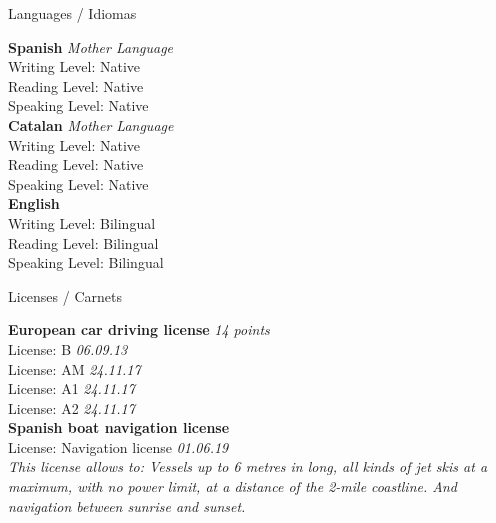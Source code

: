 \documentclass{resume} %
\begin{document}
\begin{rSection}{Languages / Idiomas}

{\bf Spanish} \hfill {\em Mother Language}\\ 
Writing Level: Native \\
Reading Level: Native \\
Speaking Level: Native \\

{\bf Catalan} \hfill {\em Mother Language}\\ 
Writing Level: Native \\
Reading Level: Native \\
Speaking Level: Native \\

{\bf English} \\ 
Writing Level: Bilingual \\
Reading Level: Bilingual \\
Speaking Level: Bilingual \\

\end{rSection}


\begin{rSection}{Licenses / Carnets}

{\bf European car driving license} \hfill {\em 14 points}\\ 
License: B \hfill {\em 06.09.13} \\
License: AM \hfill {\em 24.11.17} \\
License: A1 \hfill {\em 24.11.17} \\
License: A2 \hfill {\em 24.11.17} \\

{\bf Spanish boat navigation license} \\ 
License: Navigation license \hfill {\em 01.06.19} \\
{\it This license allows to: Vessels up to 6 metres in long, all kinds of jet skis at a maximum, with no power limit, at a distance of the 2-mile coastline. And navigation between sunrise and sunset.}

\end{rSection}

\end{document}
